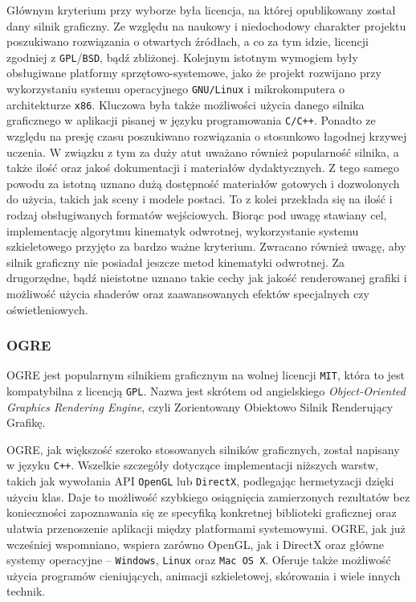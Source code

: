 \documentclass[11pt]{mwrep}
\begin{document}
    Głównym kryterium przy wyborze była licencja, na której opublikowany został dany silnik graficzny. Ze względu na naukowy i niedochodowy charakter projektu poszukiwano rozwiązania o otwartych źródłach, a co za tym idzie, licencji zgodniej z \texttt{GPL}/\texttt{BSD}, bądź zbliżonej. Kolejnym istotnym wymogiem były obsługiwane platformy sprzętowo-sys\-te\-mo\-we, jako że projekt rozwijano przy wykorzystaniu systemu operacyjnego \texttt{GNU/Linux} i mikrokomputera o architekturze \texttt{x86}.  Kluczowa była także możliwości użycia danego silnika graficznego w aplikacji pisanej w języku programowania \texttt{C/C++}. Ponadto ze względu na presję czasu poszukiwano rozwiązania o stosunkowo łagodnej krzywej uczenia. W związku z tym za duży atut uważano również popularność silnika, a także ilość oraz jakoś dokumentacji i materiałów dydaktycznych. Z tego samego powodu za istotną uznano dużą dostępność materiałów gotowych i dozwolonych do użycia, takich jak sceny i modele postaci. To z kolei przekłada się na ilość i rodzaj obsługiwanych formatów wejściowych. Biorąc pod uwagę stawiany cel, implementację algorytmu kinematyk odwrotnej, wykorzystanie systemu szkieletowego przyjęto za bardzo ważne kryterium. Zwracano również uwagę, aby silnik graficzny nie posiadał jeszcze metod kinematyki odwrotnej. Za drugorzędne, bądź nieistotne uznano takie cechy jak jakość renderowanej grafiki i możliwość użycia shaderów oraz zaawansowanych efektów specjalnych czy oświetleniowych.

 
      \subsubsection{OGRE}

      OGRE jest popularnym silnikiem graficznym na wolnej licencji \texttt{MIT}, która to jest kompatybilna z licencją \texttt{GPL}. Nazwa jest skrótem od angielskiego \textit{Object-Oriented Graphics Rendering Engine}, czyli Zorientowany Obiektowo Silnik Renderujący Grafikę.

      OGRE, jak większość szeroko stosowanych silników graficznych, został napisany w języku \texttt{C++}. Wszelkie szczegóły dotyczące implementacji niższych warstw, takich jak wywołania API \texttt{OpenGL} lub \texttt{DirectX}, podlegając hermetyzacji dzięki użyciu klas. Daje to możliwość szybkiego osiągnięcia zamierzonych rezultatów bez konieczności zapoznawania się ze specyfiką konkretnej biblioteki graficznej oraz ułatwia przenoszenie aplikacji między platformami systemowymi. OGRE, jak już wcześniej wspomniano, wspiera zarówno OpenGL, jak i DirectX oraz główne systemy operacyjne -- \texttt{Windows}, \texttt{Linux} oraz \texttt{Mac OS X}. Oferuje także możliwość użycia programów cieniujących, animacji szkieletowej, skórowania i wiele innych technik. 
\end{document}
